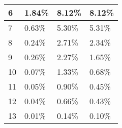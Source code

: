 \begin{table}
\begin{tabular}{|l|l|l|l|}
6                                                        & 1.84\%                                                     & 8.12\%                                                                                       & 8.12\%                                                                                        \\ \hline
7                                                        & 0.63\%                                                     & 5.30\%                                                                                       & 5.31\%                                                                                        \\ \hline
8                                                        & 0.24\%                                                     & 2.71\%                                                                                       & 2.34\%                                                                                        \\ \hline
9                                                        & 0.26\%                                                     & 2.27\%                                                                                       & 1.65\%                                                                                        \\ \hline
10                                                       & 0.07\%                                                     & 1.33\%                                                                                       & 0.68\%                                                                                        \\ \hline
11                                                       & 0.05\%                                                     & 0.90\%                                                                                       & 0.45\%                                                                                        \\ \hline
12                                                       & 0.04\%                                                     & 0.66\%                                                                                       & 0.43\%                                                                                        \\ \hline
13                                                       & 0.01\%                                                     & 0.14\%                                                                                       & 0.10\%                                                                                        \\ \hline

\end{tabular}
\end{table}
